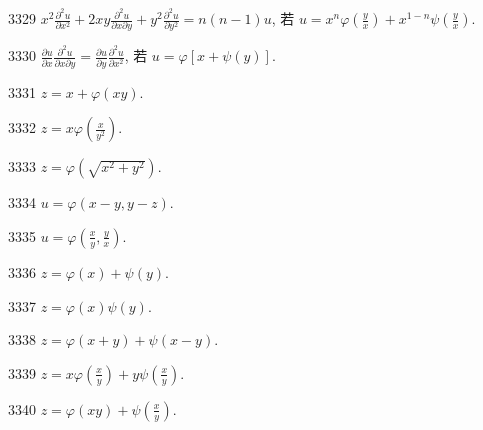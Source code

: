 \begin{prob}[S]{3329}
$x^2\frac{\partial^2 u}{\partial x^2} + 2xy\frac{\partial^2 u}{\partial x\partial y} + y^2\frac{\partial^2 u}{\partial y^2} = n(n - 1)u$, 若 $u = x^n\varphi\left(\frac{y}{x}\right) + x^{1 - n}\psi\left(\frac{y}{x}\right)$.
\end{prob}

\begin{prob}[S]{3330}
$\frac{\partial u}{\partial x}\frac{\partial^2 u}{\partial x\partial y} = \frac{\partial u}{\partial y}\frac{\partial^2 u}{\partial x^2}$, 若 $u = \varphi[x + \psi(y)]$.
\end{prob}


\begin{prob}[S]{3331}
$z = x + \varphi(xy)$.
\end{prob}

\begin{prob}[S]{3332}
$z = x\varphi\left(\frac{x}{y^2}\right)$.
\end{prob}

\begin{prob}[S]{3333}
$z = \varphi(\sqrt{x^2 + y^2})$.
\end{prob}

\begin{prob}[S]{3334}
$u = \varphi(x - y, y - z)$.
\end{prob}

\begin{prob}[S]{3335}
$u = \varphi\left(\frac{x}{y}, \frac{y}{x}\right)$.
\end{prob}

\begin{prob}[S]{3336}
$z = \varphi(x) + \psi(y)$.
\end{prob}

\begin{prob}[S]{3337}
$z = \varphi(x)\psi(y)$.
\end{prob}

\begin{prob}[S]{3338}
$z = \varphi(x + y) + \psi(x - y)$.
\end{prob}

\begin{prob}[S]{3339}
$z = x\varphi\left(\frac{x}{y}\right) + y\psi\left(\frac{x}{y}\right)$.
\end{prob}

\begin{prob}[S]{3340}
$z = \varphi(xy) + \psi\left(\frac{x}{y}\right)$.
\end{prob}


